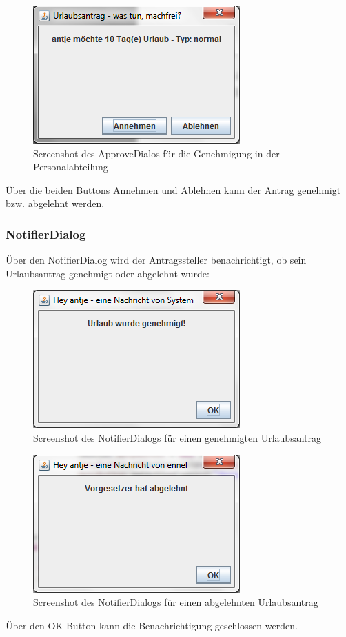 \begin{figure}[H]
\centering
\includegraphics[width=0.5\linewidth]{Bilder/DialogPersonalabteilungGenehmigung}
\caption{Screenshot des ApproveDialos für die Genehmigung in der Personalabteilung}
\label{fig:DialogPersonalabteilungGenehmigung}
\end{figure}

Über die beiden Buttons Annehmen und Ablehnen kann der Antrag genehmigt bzw. abgelehnt werden.

\subsubsection{NotifierDialog}
Über den NotifierDialog wird der Antragssteller benachrichtigt, ob sein Urlaubsantrag genehmigt oder abgelehnt wurde:

\begin{figure}[H]
\centering
\includegraphics[width=0.5\linewidth]{Bilder/DialogBenachrichtigungGenehmigt}
\caption{Screenshot des NotifierDialogs für einen genehmigten Urlaubsantrag}
\label{fig:DialogBenachrichtigungGenehmigt}
\end{figure}

\begin{figure}[H]
\centering
\includegraphics[width=0.5\linewidth]{Bilder/DialogBenachrichtigungAbgelehnt}
\caption{Screenshot des NotifierDialogs für einen abgelehnten Urlaubsantrag}
\label{fig:DialogBenachrichtigungAbgelehnt}
\end{figure}

Über den OK-Button kann die Benachrichtigung geschlossen werden.


